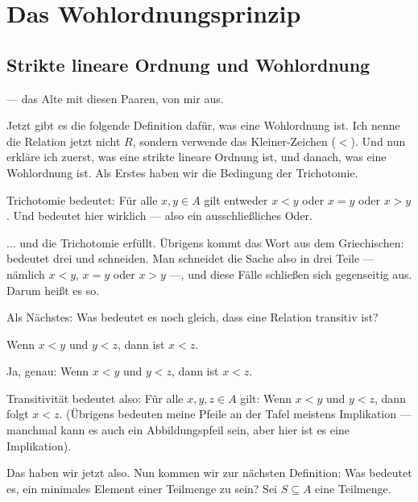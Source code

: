 \section{Das Wohlordnungsprinzip}
\subsection{Strikte lineare Ordnung und Wohlordnung}

\begin{spoken-clean}[00:28:43 - 00:30:02]
--- das Alte mit diesen Paaren, von mir aus.

Jetzt gibt es die folgende Definition dafür, was eine Wohlordnung ist. Ich nenne die Relation jetzt nicht $R$, sondern verwende das Kleiner-Zeichen ($<$). Und nun erkläre ich zuerst, was eine strikte lineare Ordnung ist, und danach, was eine Wohlordnung ist. Als Erstes haben wir die Bedingung der Trichotomie.

Trichotomie bedeutet: Für alle $x, y \in A$ gilt entweder $x < y$ oder $x = y$ oder $x > y$. Und  bedeutet hier wirklich  --- also ein ausschließliches Oder.
\end{spoken-clean}

\begin{spoken-clean}[00:30:02 - 00:30:44]
... und die Trichotomie erfüllt. Übrigens kommt das Wort aus dem Griechischen:  bedeutet drei und  schneiden. Man schneidet die Sache also in drei Teile --- nämlich $x < y$, $x = y$ oder $x > y$ ---, und diese Fälle schließen sich gegenseitig aus. Darum heißt es so.

Als Nächstes: Was bedeutet es noch gleich, dass eine Relation transitiv ist?
\end{spoken-clean}

\begin{student-interaction}[Studentenantwort]
Wenn $x < y$ und $y < z$, dann ist $x < z$.
\end{student-interaction}

\begin{spoken-clean}[00:30:44 - 00:31:13]
Ja, genau: Wenn $x < y$ und $y < z$, dann ist $x < z$.

Transitivität bedeutet also: Für alle $x, y, z \in A$ gilt: Wenn $x < y$ und $y < z$, dann folgt $x < z$. (Übrigens bedeuten meine Pfeile an der Tafel meistens Implikation --- manchmal kann es auch ein Abbildungspfeil sein, aber hier ist es eine Implikation).

Das haben wir jetzt also. Nun kommen wir zur nächsten Definition: Was bedeutet es, ein minimales Element einer Teilmenge zu sein? Sei $S \subseteq A$ eine Teilmenge.
\end{spoken-clean}

